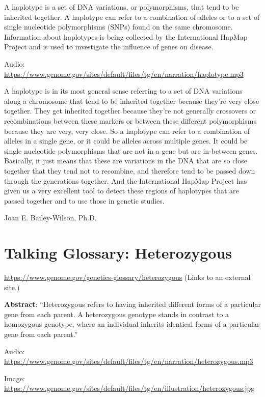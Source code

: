 \documentclass[
]{book}
\begin{document}
A haplotype is a set of DNA variations, or polymorphisms, that tend to be inherited together. A haplotype can refer to a combination of alleles or to a set of single nucleotide polymorphisms (SNPs) found on the same chromosome. Information about haplotypes is being collected by the International HapMap Project and is used to investigate the influence of genes on disease.

Audio: \url{https://www.genome.gov/sites/default/files/tg/en/narration/haplotype.mp3}

A haplotype is in its most general sense referring to a set of DNA variations along a chromosome that tend to be inherited together because they're very close together. They get inherited together because they're not generally crossovers or recombinations between these markers or between these different polymorphisms because they are very, very close. So a haplotype can refer to a combination of alleles in a single gene, or it could be alleles across multiple genes. It could be single nucleotide polymorphisms that are not in a gene but are in-between genes. Basically, it just means that these are variations in the DNA that are so close together that they tend not to recombine, and therefore tend to be passed down through the generations together. And the International HapMap Project has given us a very excellent tool to detect these regions of haplotypes that are passed together and to use those in genetic studies.

Joan E. Bailey-Wilson, Ph.D.

\hypertarget{talking-glossary-heterozygous}{%
\section{Talking Glossary: Heterozygous}\label{talking-glossary-heterozygous}}

\url{https://www.genome.gov/genetics-glossary/heterozygous} (Links to an external site.)

\textbf{Abstract}: ``Heterozygous refers to having inherited different forms of a particular gene from each parent. A heterozygous genotype stands in contrast to a homozygous genotype, where an individual inherits identical forms of a particular gene from each parent.''

Audio: \url{https://www.genome.gov/sites/default/files/tg/en/narration/heterozygous.mp3}

Image: \url{https://www.genome.gov/sites/default/files/tg/en/illustration/heterozygous.jpg}
\end{document}
